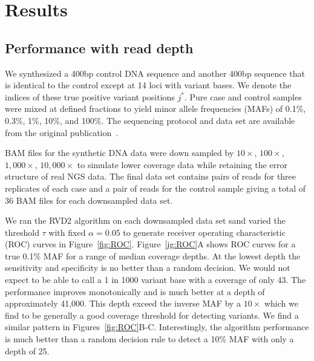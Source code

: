 \documentclass[11pt,reqno]{amsart}
\begin{document}
\section{Results}

\subsection{Performance with read depth}

We synthesized a 400bp control DNA sequence and another 400bp sequence that is identical to the control except at 14 loci with variant bases. We denote the indices of these true positive variant positions $j^*$. Pure case and control samples were mixed at defined fractions to yield minor allele frequencies (MAFs) of 0.1\%, 0.3\%, 1\%, 10\%, and 100\%. The sequencing protocol and data set are available from the original publication~\cite{}.

BAM files for the synthetic DNA data were down sampled by $10\times$, $100\times$, $1,000\times$, $10,000\times$ to simulate lower coverage data while retaining the error structure of real NGS data. The final data set contains pairs of reads for three replicates of each case and a pair of reads for the control sample giving a total of 36 BAM files for each downsampled data set.

We ran the RVD2 algorithm on each downsampled data set sand varied the threshold $\tau$ with fixed $\alpha=0.05$ to generate receiver operating characteristic (ROC) curves in Figure~\ref{fig:ROC}. Figure~\ref{ig:ROC}A shows ROC curves for a true 0.1\% MAF for a range of median coverage depths. At the lowest depth the sensitivity and specificity is no better than a random decision. We would not expect to be able to call a 1 in 1000 variant base with a coverage of only 43. The performance improves monotonically and is much better at a depth of approximately 41,000. This depth exceed the inverse MAF by a $10\times$ which we find to be generally a good coverage threshold for detecting variants. We find a similar pattern in Figures~\ref{fig:ROC}B-C. Interestingly, the algorithm performance is much better than a random decision rule to detect a 10\% MAF with only a depth of 25.
\end{document}
